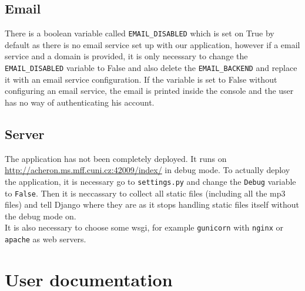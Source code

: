 \subsection{Email}
There is a boolean variable called \texttt{EMAIL\_DISABLED} which is set on True by default as there is no email service set up with our application, however if a email service and a domain is provided, it is only necessary to change the \texttt{EMAIL\_DISABLED} variable to False and also delete the \texttt{EMAIL\_BACKEND} and replace it with an email service configuration. If the variable is set to False without configuring an email service, the email is printed inside the console and the user has no way of authenticating his account.

\subsection{Server}

The application has not been completely deployed. It runs on \url{http://acheron.ms.mff.cuni.cz:42009/index/} in debug mode. To actually deploy the application, it is necessary go to \texttt{settings.py} and change the \texttt{Debug} variable to \texttt{False}. Then it is neccassary to collect all static files (including all the mp3 files) and tell Django where they are as it stops handling static files itself without the debug mode on.\\
It is also necessary to choose some wsgi, for example \texttt{gunicorn} with \texttt{nginx} or \texttt{apache} as web servers.

\section{User documentation}


